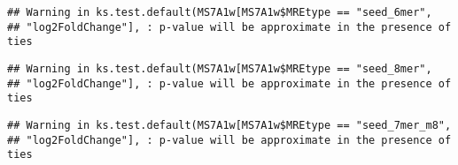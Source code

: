 \documentclass[
]{article}
\newenvironment{Shaded}{\begin{snugshade}}{\end{snugshade}}
\newcommand{\FunctionTok}[1]{\textcolor[rgb]{0.13,0.29,0.53}{\textbf{#1}}}
\newcommand{\NormalTok}[1]{#1}
\newcommand{\OtherTok}[1]{\textcolor[rgb]{0.56,0.35,0.01}{#1}}
\newcommand{\SpecialCharTok}[1]{\textcolor[rgb]{0.81,0.36,0.00}{\textbf{#1}}}
\newcommand{\StringTok}[1]{\textcolor[rgb]{0.31,0.60,0.02}{#1}}
\begin{document}
\begin{verbatim}
## Warning in ks.test.default(MS7A1w[MS7A1w$MREtype == "seed_6mer",
## "log2FoldChange"], : p-value will be approximate in the presence of ties
\end{verbatim}

\begin{Shaded}
\end{Shaded}

\begin{verbatim}
## Warning in ks.test.default(MS7A1w[MS7A1w$MREtype == "seed_8mer",
## "log2FoldChange"], : p-value will be approximate in the presence of ties
\end{verbatim}

\begin{Shaded}
\end{Shaded}

\begin{verbatim}
## Warning in ks.test.default(MS7A1w[MS7A1w$MREtype == "seed_7mer_m8",
## "log2FoldChange"], : p-value will be approximate in the presence of ties
\end{verbatim}

\begin{Shaded}
\end{Shaded}
\end{document}
